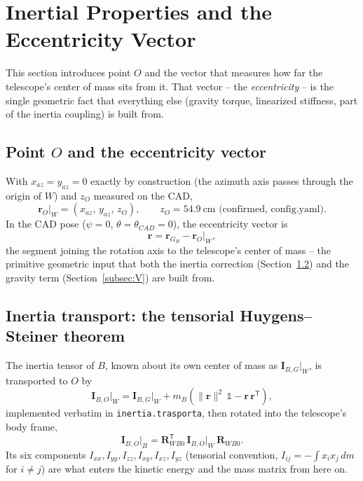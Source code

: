 \documentclass[11pt,a4paper]{article}
\numberwithin{equation}{section}
\newcommand{\bs}[1]{\boldsymbol{#1}}
\newcommand{\T}{^{\mathsf T}}
\begin{document}
\section{Inertial Properties and the Eccentricity Vector}
\label{sec:inerzia}

This section introduces point $O$ and the vector that measures how far the telescope's center of mass sits from it. That vector -- the \emph{eccentricity} -- is the single geometric fact that everything else (gravity torque, linearized stiffness, part of the inertia coupling) is built from.

\subsection{Point $O$ and the eccentricity vector}

With $x_{az}=y_{az}=0$ exactly by construction (the azimuth axis passes through the origin of $W$) and $z_O$ measured on the CAD,
\begin{equation}
\bs r_O\big|_W = (x_{az},\,y_{az},\,z_O), \qquad z_O = 54.9\ \text{cm (confirmed, config.yaml)}.
\label{eq:rO}
\end{equation}
In the CAD pose ($\psi=0$, $\theta=\theta_{CAD}=0$), the eccentricity vector is
\begin{equation}
\bs r = \bs r_{G_B} - \bs r_O \Big|_W ,
\label{eq:r-ecc}
\end{equation}
the segment joining the rotation axis to the telescope's center of mass -- the primitive geometric input that both the inertia correction (Section~\ref{subsec:huygens}) and the gravity term (Section~\ref{subsec:V}) are built from.

\subsection{Inertia transport: the tensorial Huygens--Steiner theorem}
\label{subsec:huygens}

The inertia tensor of $B$, known about its own center of mass as $\bs I_{B,G}|_W$, is transported to $O$ by
\begin{equation}
\bs I_{B,O}\big|_W = \bs I_{B,G}\big|_W + m_B\left(\lVert\bs r\rVert^2\,\mathbb 1 - \bs r\,\bs r\T\right),
\label{eq:huygens}
\end{equation}
implemented verbatim in \texttt{inertia.trasporta}, then rotated into the telescope's body frame,
\begin{equation}
\bs I_{B,O}\big|_B = \bs R_{WB0}\T\,\bs I_{B,O}\big|_W\,\bs R_{WB0}.
\label{eq:IBO-B}
\end{equation}
Its six components $I_{xx},I_{yy},I_{zz},I_{xy},I_{xz},I_{yz}$ (tensorial convention, $I_{ij}=-\int x_ix_j\,dm$ for $i\ne j$) are what enters the kinetic energy and the mass matrix from here on.
\end{document}
